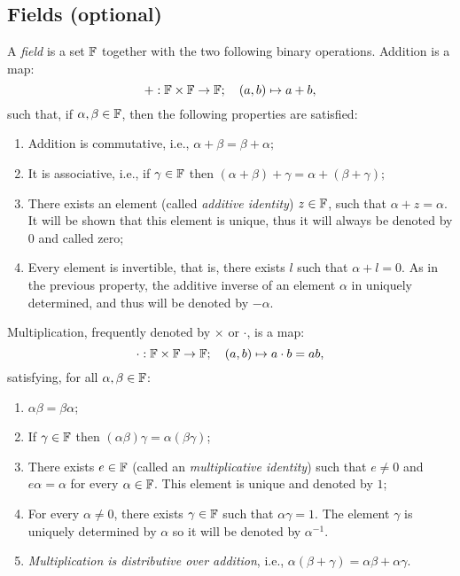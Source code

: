 \subsection{Fields (optional)}

\begin{definition}
	A \emph{field} is a set $\mathbb{F}$ together with the two following binary operations. Addition is a map:
	\begin{equation*}
		+ : \mathbb{F} \times \mathbb{F} \to \mathbb{F}; \quad (a,b) \mapsto a+b,
	\end{equation*}
	such that, if $\alpha, \beta\in \mathbb{F}$, then the following properties are satisfied:
\begin{enumerate}
	\item
		Addition is commutative, i.e., $\alpha + \beta = \beta + \alpha;$
	\item
		It is associative, i.e., if $\gamma \in \mathbb{F}$ then $(\alpha + \beta) + \gamma = \alpha + (\beta + \gamma);$
	\item
		There exists an element (called \emph{additive identity}) $z \in \mathbb{F}$, such that $\alpha + z = \alpha$. It will be shown that this element is unique, thus it will always be denoted by $0$ and called zero;
	\item
		Every element is invertible, that is, there exists $l$ such that $\alpha + l = 0$. As in the previous property, the additive inverse of an element $\alpha$ in uniquely determined, and thus will be denoted by $-\alpha$.
\end{enumerate}
Multiplication, frequently denoted by $\times$ or $\cdot$, is a map:
\begin{equation*}
	\cdot : \mathbb{F} \times \mathbb{F} \to \mathbb{F}; \quad (a,b) \mapsto a \cdot b = ab,
\end{equation*}
satisfying, for all $\alpha, \beta \in \mathbb{F}$:
\begin{enumerate}
	\item
		$\alpha \beta = \beta \alpha$;
	\item
		If $\gamma \in \mathbb{F}$ then $(\alpha \beta) \gamma = \alpha (\beta \gamma)$;
	\item
		There exists $e \in \mathbb{F}$ (called an \emph{multiplicative identity}) such that $e \neq 0$ and $e \alpha = \alpha$ for every $\alpha \in \mathbb{F}$. This element is unique and denoted by $1$;
	\item
		For every $\alpha \neq 0$, there exists $\gamma \in \mathbb{F}$ such that $\alpha \gamma = 1$. The element $\gamma$ is uniquely determined by $\alpha$ so it will be denoted by $\alpha^{-1}$.
	\item \emph{Multiplication is distributive over addition}, i.e., $\alpha( \beta + \gamma) = \alpha \beta + \alpha \gamma$.
\end{enumerate}

\end{definition}


